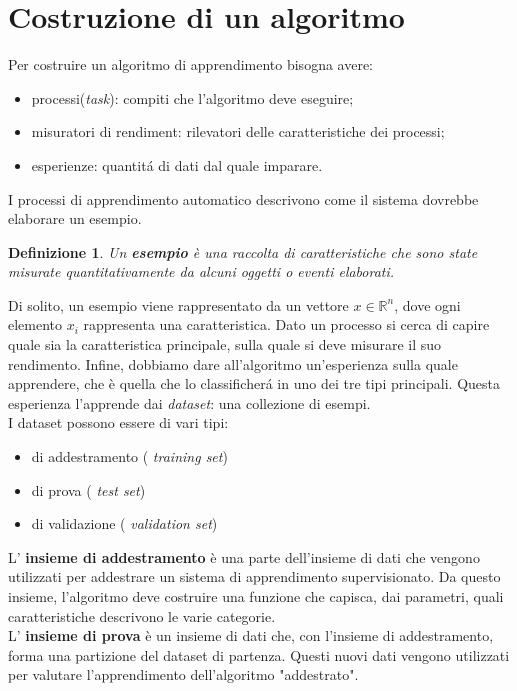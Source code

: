 \documentclass[a4paper,12pt]{report}
\begin{document}
\section{Costruzione di un algoritmo}\label{Costruzione}
Per costruire un algoritmo di apprendimento bisogna avere:
\begin{itemize}
\item processi(\textit{task}): compiti che l'algoritmo deve eseguire;
\item misuratori di rendiment: rilevatori delle caratteristiche dei processi;
\item esperienze: quantit\'{a} di dati dal quale imparare.
\end{itemize}
I processi di apprendimento automatico descrivono come il sistema dovrebbe elaborare un esempio.
\newtheorem{defin}{Definizione}
\begin{defin}
Un \textbf{esempio} \`e una raccolta di caratteristiche che sono state misurate quantitativamente da alcuni oggetti o eventi elaborati.
\end{defin}
Di solito, un esempio viene rappresentato da un vettore $x\in \mathbb{R}^{n}$, dove ogni elemento $x_{i}$ rappresenta una caratteristica.
Dato un processo si cerca di capire quale sia la caratteristica principale, sulla quale si deve misurare il suo rendimento.
Infine, dobbiamo dare all'algoritmo un'esperienza sulla quale apprendere, che \`e quella che lo classificher\'{a} in uno dei tre tipi principali.
Questa esperienza l'apprende dai \textit{dataset}: una collezione di esempi.\\
I dataset possono essere di vari tipi:
\begin{itemize}
\item di addestramento ( \textit{training set})
\item di prova ( \textit{test set})
\item di validazione ( \textit{validation set})
\end{itemize}
L' \textbf{insieme di addestramento} \`e una parte dell'insieme di dati che vengono utilizzati per addestrare un sistema di apprendimento supervisionato. Da questo insieme, l'algoritmo deve costruire una funzione che capisca, dai parametri, quali caratteristiche descrivono le varie categorie.\\
L' \textbf{insieme di prova} \`e un insieme di dati che, con l'insieme di addestramento, forma una partizione del dataset di partenza. Questi nuovi dati vengono utilizzati per valutare l'apprendimento dell'algoritmo "addestrato".\\
\end{document}
